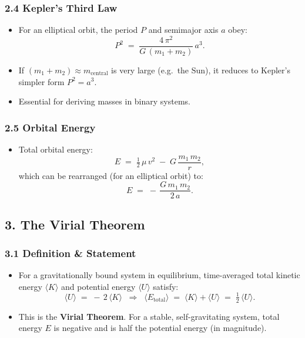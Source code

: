 \subsubsection{2.4 Kepler’s Third Law}
\begin{itemize}
  \item For an elliptical orbit, the period $P$ and semimajor axis $a$ obey:
  \[
    P^2
    \;=\;
    \frac{4\,\pi^2}{G\,(m_1 + m_2)}\,a^3.
  \]
  \item If $(m_1 + m_2) \approx m_{\text{central}}$ is very large (e.g.\ the Sun), it reduces to Kepler’s simpler form $P^2 = a^3$.
  \item Essential for deriving masses in binary systems.
\end{itemize}

\subsubsection{2.5 Orbital Energy}
\begin{itemize}
  \item Total orbital energy:
  \[
    E
    \;=\;
    \tfrac{1}{2}\,\mu\,v^2
    \;-\;
    G\,\frac{m_1\,m_2}{r},
  \]
  which can be rearranged (for an elliptical orbit) to:
  \[
    E
    \;=\;
    -\,\frac{G\,m_1\,m_2}{\,2\,a\,}.
  \]
\end{itemize}

\subsection{3. The Virial Theorem}

\subsubsection{3.1 Definition \& Statement}
\begin{itemize}
  \item For a gravitationally bound system in equilibrium, time-averaged total kinetic energy $\langle K\rangle$ and potential energy $\langle U\rangle$ satisfy:
  \[
    \langle U\rangle
    \;=\;
    -\,2\,\langle K\rangle
    \;\;\Longrightarrow\;\;
    \langle E_{\text{total}}\rangle
    \;=\;
    \langle K\rangle + \langle U\rangle
    \;=\;
    \tfrac12\,\langle U\rangle.
  \]
  \item This is the \textbf{Virial Theorem}. For a stable, self-gravitating system, total energy $E$ is negative and is half the potential energy (in magnitude).
\end{itemize}

